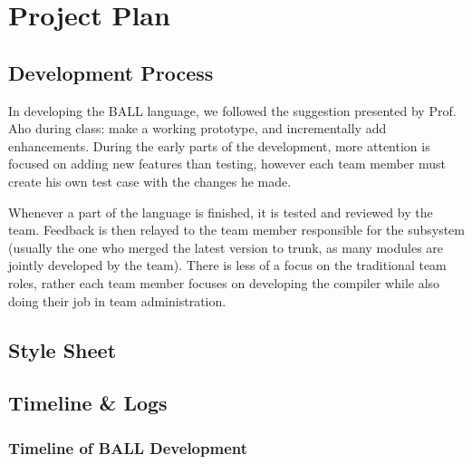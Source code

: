 \chapter{Project Plan}

\section{Development Process}\label{Process}

In developing the BALL language, we followed the suggestion presented
by Prof. Aho during class: make a working prototype, and incrementally
add enhancements. During the early parts of the development, more
attention is focused on adding new features than testing, however each
team member must create his own test case with the changes he made.

Whenever a part of the language is finished, it is tested and reviewed
by the team. Feedback is then relayed to the team member responsible
for the subsystem (usually the one who merged the latest version to
trunk, as many modules are jointly developed by the team). There is
less of a focus on the traditional team roles, rather each team member
focuses on developing the compiler while also doing their job in team
administration.

\pagebreak
\section{Style Sheet}\label{Style}



\pagebreak

\section{Timeline \& Logs}\label{TimelineLogs}
\subsection{Timeline of BALL Development}


